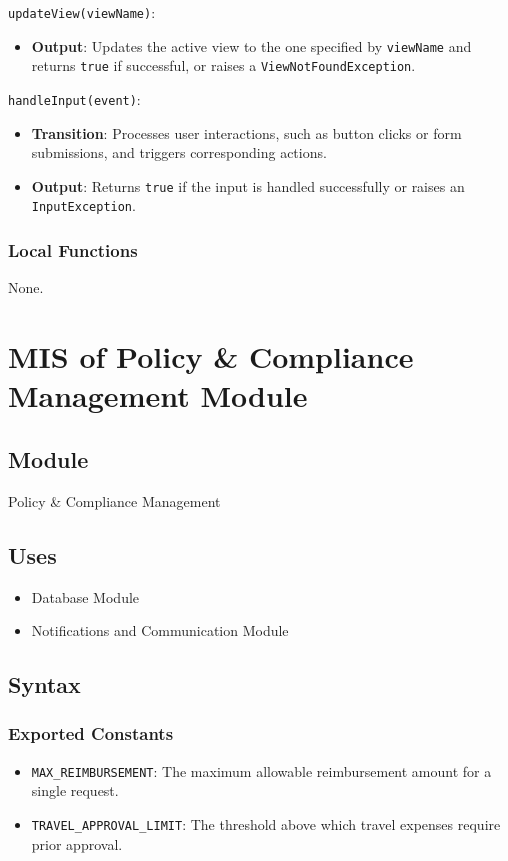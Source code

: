 \documentclass[12pt, titlepage]{article}
\begin{document}
\noindent \texttt{updateView(viewName)}:
\begin{itemize}
    \item \textbf{Output}: Updates the active view to the one specified by \texttt{viewName} and returns \texttt{true} if successful, or raises a \texttt{ViewNotFoundException}.
\end{itemize}

\noindent \texttt{handleInput(event)}:
\begin{itemize}
    \item \textbf{Transition}: Processes user interactions, such as button clicks or form submissions, and triggers corresponding actions.
    \item \textbf{Output}: Returns \texttt{true} if the input is handled successfully or raises an \texttt{InputException}.
\end{itemize}

\subsubsection{Local Functions}
None.

\section{MIS of Policy \& Compliance Management Module}

\subsection{Module}
Policy \& Compliance Management

\subsection{Uses}
\begin{itemize}
    \item Database Module
    \item Notifications and Communication Module
\end{itemize}

\subsection{Syntax}

\subsubsection{Exported Constants}
\begin{itemize}
    \item \texttt{MAX\_REIMBURSEMENT}: The maximum allowable reimbursement amount for a single request.
    \item \texttt{TRAVEL\_APPROVAL\_LIMIT}: The threshold above which travel expenses require prior approval.
\end{itemize}
\end{document}
